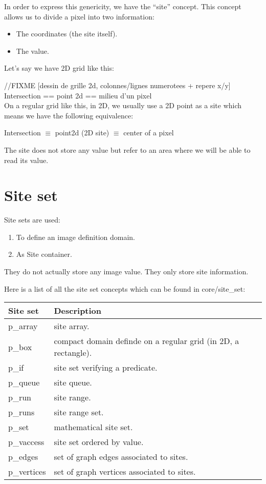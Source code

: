\documentclass{report}
\begin{document}
In order to express this genericity, we have the ``site'' concept.
This concept allows us to divide a pixel into two information:
\begin{itemize}
  \item The coordinates (the site itself).
  \item The value.
\end{itemize}

Let's say we have 2D grid like this:

//FIXME
[dessin de grille 2d, colonnes/lignes numerotees + repere x/y]
Intersection == point 2d == milieu d'un pixel \\

On a regular grid like this, in 2D, we usually use a 2D point as a site which
means we have the following equivalence:

\begin{center}
  Intersection $\equiv$ point2d (2D site) $\equiv$ center of a pixel
\end{center}

The site does not store any value but refer to an area where we will be able
to read its value.


\clearpage
\newpage
\chapter{Site set}

Site sets are used:
\begin{enumerate}
  \item To define an image definition domain.
  \item As Site container.
\end{enumerate}

They do not actually store any image value. They only store site information.

Here is a list of all the site set concepts which can be found in
core/site\_set:

\begin{tabular}{|l|p{8cm}|}
\hline
Site set    & Description \\
\hline

p\_array    & site array. \\
\hline
p\_box	    & compact domain definde on a regular grid (in 2D, a rectangle). \\
\hline
p\_if	    & site set verifying a predicate. \\
\hline
p\_queue    & site queue. \\
\hline
p\_run	    & site range. \\
\hline
p\_runs	    & site range set. \\
\hline
p\_set	    & mathematical site set. \\
\hline
p\_vaccess  & site set ordered by value. \\
\hline
p\_edges    & set of graph edges associated to sites. \\
\hline
p\_vertices & set of graph vertices associated to sites.\\
\hline
\end{tabular}
\end{document}
